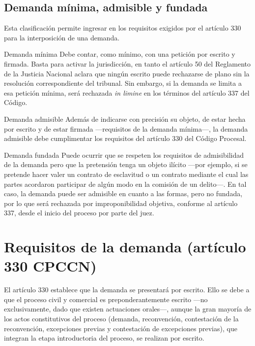 \documentclass[12pt,oneside]{book}
\begin{document}
\section{Demanda mínima, admisible y fundada}

Esta clasificación permite ingresar en los requisitos exigidos por el artículo 330 para la interposición de una demanda.

\begin{definition}{Demanda mínima}
Debe contar, como mínimo, con una petición por escrito y firmada. Basta para activar la jurisdicción, en tanto el artículo 50 del Reglamento de la Justicia Nacional aclara que ningún escrito puede rechazarse de plano sin la resolución correspondiente del tribunal. Sin embargo, si la demanda se limita a esa petición mínima, será rechazada \textit{in limine} en los términos del artículo 337 del Código.
\end{definition}

\begin{definition}{Demanda admisible}
Además de indicarse con precisión su objeto, de estar hecha por escrito y de estar firmada —requisitos de la demanda mínima—, la demanda admisible debe cumplimentar los requisitos del artículo 330 del Código Procesal.
\end{definition}

\begin{definition}{Demanda fundada}
Puede ocurrir que se respeten los requisitos de admisibilidad de la demanda pero que la pretensión tenga un objeto ilícito —por ejemplo, si se pretende hacer valer un contrato de esclavitud o un contrato mediante el cual las partes acordaron participar de algún modo en la comisión de un delito—. En tal caso, la demanda puede ser admisible en cuanto a las formas, pero no fundada, por lo que será rechazada por improponibilidad objetiva, conforme al artículo 337, desde el inicio del proceso por parte del juez.
\end{definition}

\chapter{Requisitos de la demanda (artículo 330 CPCCN)}

El artículo 330 establece que la demanda se presentará por escrito. Ello se debe a que el proceso civil y comercial es preponderantemente escrito —no exclusivamente, dado que existen actuaciones orales—, aunque la gran mayoría de los actos constitutivos del proceso (demanda, reconvención, contestación de la reconvención, excepciones previas y contestación de excepciones previas), que integran la etapa introductoria del proceso, se realizan por escrito.
\end{document}
